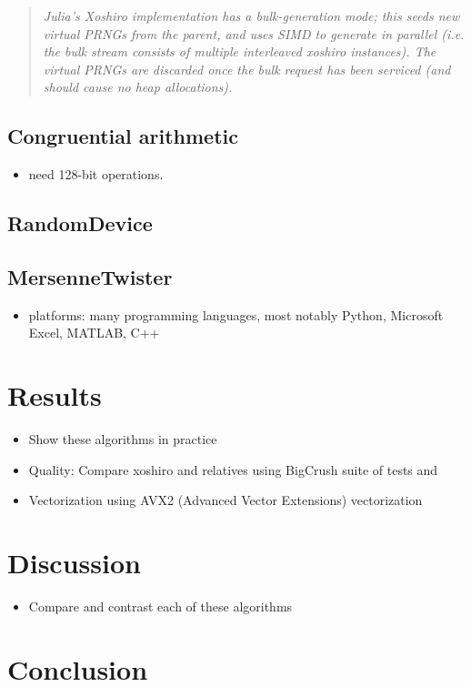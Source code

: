 \documentclass{article}
\begin{document}
            \begin{quote}
                \textit{Julia's Xoshiro implementation has a bulk-generation mode; this seeds new virtual PRNGs from the parent, and uses SIMD to generate in parallel (i.e. the bulk stream consists of multiple interleaved xoshiro instances). The virtual PRNGs are discarded once the bulk request has been serviced (and should cause no heap allocations).}
            \end{quote}

        \subsection*{Congruential arithmetic}

            \begin{itemize}
                \item need 128-bit operations.
            \end{itemize}

        \subsection*{RandomDevice}
        
        \subsection*{MersenneTwister}

            \begin{itemize}
                \item platforms: many programming languages, most notably Python\cite{Python}, Microsoft Excel\cite{Excel}, MATLAB\cite{MATLAB}, C++\cite{Cpp}
            \end{itemize}

    \section*{Results}

        \begin{itemize}
            \item Show these algorithms in practice
            \item Quality\cite{Shootout}: Compare xoshiro and relatives using BigCrush suite of tests \cite{TestU01} and \cite{HammingWeightDependencies}
            \item Vectorization using AVX2 (Advanced Vector Extensions) vectorization \cite{Shootout}
        \end{itemize}

    \section*{Discussion}

        \begin{itemize}
            \item Compare and contrast each of these algorithms
        \end{itemize}

    \section*{Conclusion}

    \printbibliography
\end{document}
